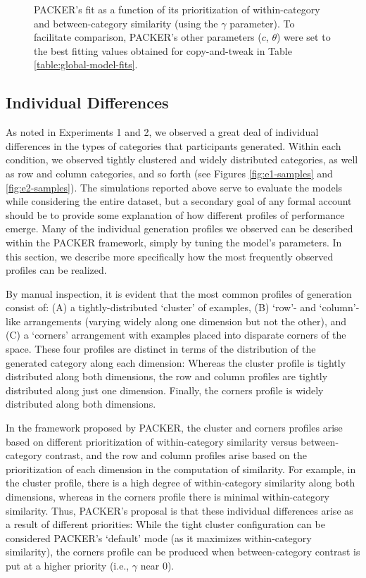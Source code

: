 \documentclass[12pt]{article}
\newcommand\inputpgf[2]{{
\let\pgfimageWithoutPath\pgfimage
\renewcommand{\pgfimage}[2][]{\pgfimageWithoutPath[##1]{#1/##2}}

}}
\begin{document}
\begin{flushleft}
\begin{figure}
    \begin{center}
    \inputpgf{figs/}{packer-loglike.pgf}
    \caption{PACKER's fit as a function of its prioritization of within-category and between-category similarity (using the $\gamma$ parameter). To facilitate comparison, PACKER's other parameters ($c$, $\theta$) were set to the best fitting values obtained for copy-and-tweak in Table \ref{table:global-model-fits}. }
    \label{fig:packer-loglike}
    \end{center}
\end{figure}


\subsection{Individual Differences}
\label{section:individual-diffs}

As noted in Experiments 1 and 2, we observed a great deal of individual differences in the types of categories that participants generated. Within each condition, we observed tightly clustered and widely distributed categories, as well as row and column categories, and so forth (see Figures \ref{fig:e1-samples} and \ref{fig:e2-samples}). The simulations reported above serve to evaluate the models while considering the entire dataset, but a secondary goal of any formal account should be to provide some explanation of how different profiles of performance emerge. Many of the individual generation profiles we observed can be described within the PACKER framework, simply by tuning the model's parameters. In this section, we describe more specifically how the most frequently observed profiles can be realized.

By manual inspection, it is evident that the most common profiles of generation consist of: (A) a tightly-distributed `cluster' of examples, (B) `row'- and `column'-like arrangements (varying widely along one dimension but not the other), and (C) a `corners' arrangement with examples placed into disparate corners of the space. These four profiles are distinct in terms of the distribution of the generated category along each dimension: Whereas the cluster profile is tightly distributed along both dimensions, the row and column profiles are tightly distributed along just one dimension. Finally, the corners profile is widely distributed along both dimensions.

In the framework proposed by PACKER, the cluster and corners profiles arise based on different prioritization of within-category similarity versus between-category contrast, and the row and column profiles arise based on the prioritization of each dimension in the computation of similarity. For example, in the cluster profile, there is a high degree of within-category similarity along both dimensions, whereas in the corners profile there is minimal within-category similarity. Thus, PACKER's proposal is that these individual differences arise as a result of different priorities: While the tight cluster configuration can be considered PACKER's `default' mode (as it maximizes within-category similarity), the corners profile can be produced when between-category contrast is put at a higher priority (i.e., $\gamma$ near $0$).


\end{flushleft}
\end{document}
